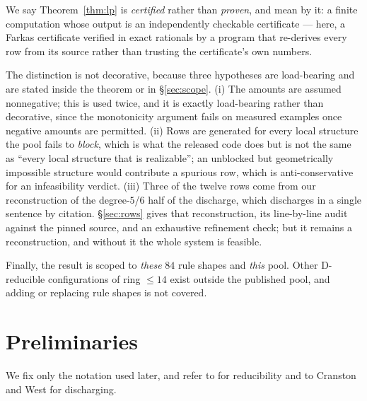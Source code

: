 \documentclass[11pt]{article}
\theoremstyle{definition}
\begin{document}
We say Theorem~\ref{thm:lp} is \emph{certified} rather than \emph{proven}, and
mean by it: a finite computation whose output is an independently checkable
certificate --- here, a Farkas certificate verified in exact rationals by a
program that re-derives every row from its source rather than trusting the
certificate's own numbers.

The distinction is not decorative, because three hypotheses are load-bearing and
are stated inside the theorem or in \S\ref{sec:scope}. (i) The amounts are
assumed nonnegative; this is used twice, and it is exactly load-bearing rather
than decorative, since the monotonicity argument fails on measured examples once
negative amounts are permitted. (ii) Rows are generated for every local structure
the pool fails to \emph{block}, which is what the released code does but is not
the same as ``every local structure that is realizable''; an unblocked but
geometrically impossible structure would contribute a spurious row, which is
anti-conservative for an infeasibility verdict. (iii) Three of the twelve rows
come from our reconstruction of the degree-$5$/$6$ half of the discharge, which
\cite{nl4ct2026} discharges in a single sentence by citation. \S\ref{sec:rows}
gives that reconstruction, its line-by-line audit against the pinned source, and
an exhaustive refinement check; but it remains a reconstruction, and without it
the whole system is feasible.

Finally, the result is scoped to \emph{these} $84$ rule shapes and \emph{this}
pool. Other D-reducible configurations of ring $\le14$ exist outside the
published pool, and adding or replacing rule shapes is not covered.
\section{Preliminaries}
\label{sec:prelim}

We fix only the notation used later, and refer to \cite{rsst1997,rsst-reduce}
for reducibility and to Cranston and West \cite{cranston2017discharging} for
discharging.
\end{document}
